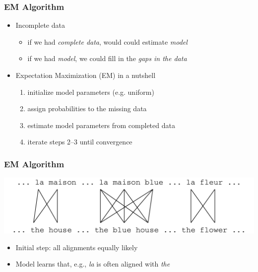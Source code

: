 \begin{frame}
\frametitle{EM Algorithm\koehnref}
\begin{block}{}
\begin{itemize}[<+->]
\item Incomplete data
\begin{itemize}
\item if we had {\em complete data}, would could estimate {\em model}
\item if we had {\em model}, we could fill in the {\em gaps in the data}
\end{itemize}
\item Expectation Maximization (EM) in a nutshell
\begin{enumerate}
\item initialize model parameters (e.g. uniform)
\item assign probabilities to the missing data
\item estimate model parameters from completed data
\item iterate steps 2--3 until convergence 
\end{enumerate}
\end{itemize}
\end{block}

\end{frame}

\begin{frame}
\frametitle{EM Algorithm\koehnref}
\begin{center}
\includegraphics[scale=0.4]{figures/em1.pdf}
\end{center}
\begin{itemize}
\item Initial step: all alignments equally likely
\item Model learns that, e.g., \textit{la} is often aligned with \textit{the}
\end{itemize}

\end{frame}

